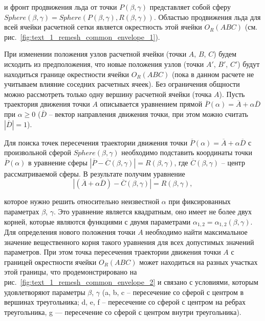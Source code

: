 и фронт продвижения льда от точки $P(\beta,\gamma)$ представляет собой сферу $Sphere(\beta,\gamma) = Sphere(P(\beta,\gamma),R(\beta,\gamma))$.
Областью продвижения льда для всей ячейки расчетной сетки является окрестность этой ячейки $O_R(ABC)$ (см. рис.~\ref{fig:text_1_remesh_common_envelope_1}).

При изменении положения узлов расчетной ячейки (точки $A$, $B$, $C$) будем исходить из предположения, что новые положения узлов (точки $A'$, $B'$, $C'$) будут находиться границе окрестности ячейки $O_R(ABC)$ (пока в данном расчете не учитываем влияние соседних расчетных ячеек).
Без ограничения общности можно рассмотреть только одну вершину расчетной ячейки (точка $A$).
Пусть траектория движения точки $A$ описывается уравнением прямой $\overline{P}(\alpha) = \overline{A} + \alpha \overline{D}$ при $\alpha \ge 0$ ($\overline{D}$ -- вектор направления движения точки, при этом можно считать $|\overline{D}| = 1$).

Для поиска точек пересечения траектории движения точки $\overline{P}(\alpha) = \overline{A} + \alpha \overline{D}$ с 
произвольной сферой $Sphere(\beta,\gamma)$ необходимо подставить координаты точки $\overline{P}(\alpha)$ в уравнение сферы $|\overline{P} - \overline{C}(\beta,\gamma)| = R(\beta,\gamma)$, где $\overline{C}(\beta,\gamma)$ -- центр рассматриваемой сферы.
В результате получим уравнение
\begin{equation}\label{eqn:text_1_remesh_common_envelope_eq}
	|(\overline{A} + \alpha \overline{D}) - \overline{C}(\beta, \gamma)| = R(\beta, \gamma),
\end{equation}

которое нужно решить относительно неизвестной $\alpha$ при фиксированных параметрах $\beta$, $\gamma$.
Это уравнение является квадратным, оно имеет не более двух корней, которые являются функциями с двумя параметрами $\alpha_{1,2} = \alpha_{1,2}(\beta,\gamma)$.
Для определения нового положения точки $A$ необходимо найти максимальное значение вещественного корня такого уравнения для всех допустимых значений параметров.
При этом точка пересечения траектории движения точки $A$ с границей окрестности ячейки $O_R(ABC)$ может находиться на разных участках этой границы, что продемонстрировано на рис.~\ref{fig:text_1_remesh_common_envelope_2} и связано с условиями, которым удовлетворяют параметры $\beta$, $\gamma$ (a, b, c -- пересечение со сферой с центром в вершинах треугольника; d, e, f -- пересечение со сферой с центром на ребрах треугольника, g — пересечение со сферой с центром внутри треугольника).

